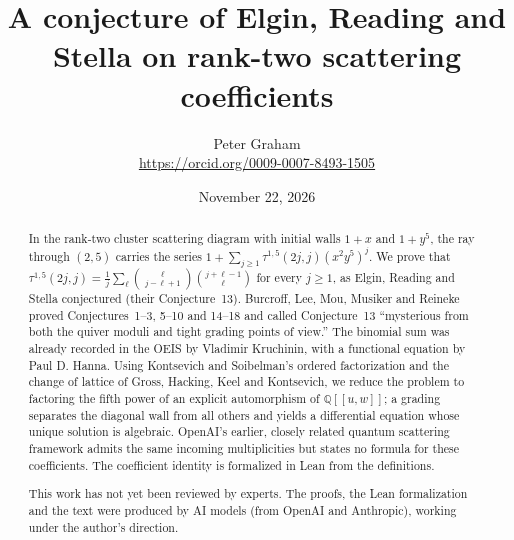 \documentclass[11pt]{article}
\title{A conjecture of Elgin, Reading and Stella on rank-two scattering coefficients}
\author{Peter Graham\\ \small\url{https://orcid.org/0009-0007-8493-1505}}
\date{November 22, 2026}
\theoremstyle{definition}
\theoremstyle{remark}
\numberwithin{equation}{section}
\newcommand{\Q}{\mathbb{Q}}
\begin{document}
\maketitle
\begin{abstract}
In the rank-two cluster scattering diagram with initial walls $1+x$ and
$1+y^5$, the ray through $(2,5)$ carries the series
$1+\sum_{j\geq1}\tau^{1,5}(2j,j)(x^2y^5)^j$. We prove that
$\tau^{1,5}(2j,j)=\frac1j\sum_{\ell}\binom{\ell}{j-\ell+1}\binom{j+\ell-1}{\ell}$
for every $j\geq1$, as Elgin, Reading and Stella conjectured (their
Conjecture~13). Burcroff, Lee, Mou, Musiker and Reineke proved
Conjectures~1--3, 5--10 and 14--18 and called Conjecture~13 ``mysterious
from both the quiver moduli and tight grading points of view.'' The
binomial sum was already recorded in the OEIS by Vladimir Kruchinin, with
a functional equation by Paul D. Hanna. Using Kontsevich and Soibelman's
ordered factorization and the change of lattice of Gross, Hacking, Keel
and Kontsevich, we reduce the problem to factoring the fifth power of an
explicit automorphism of $\Q[[u,w]]$; a grading separates the diagonal
wall from all others and yields a differential equation whose unique
solution is algebraic. OpenAI's earlier, closely related quantum
scattering framework admits the same incoming multiplicities but states
no formula for these coefficients. The coefficient identity is formalized
in Lean from the definitions.

This work has not yet been reviewed by experts.
The proofs, the Lean
formalization and the text were produced by AI models (from OpenAI and
Anthropic), working under the author's direction.
\end{abstract}
\end{document}
